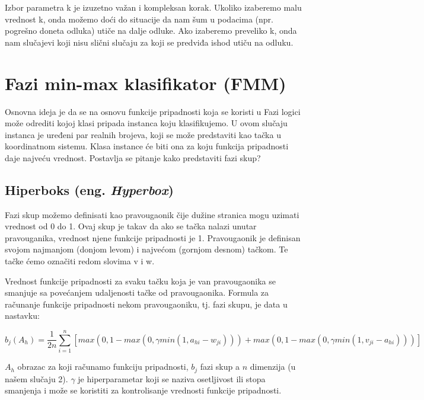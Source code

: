 \documentclass[a4paper]{article}
\begin{document}
Izbor parametra k je izuzetno važan i kompleksan korak. Ukoliko izaberemo malu vrednost k, onda možemo doći do situacije da nam
šum u podacima (npr. pogrešno doneta odluka) utiče na dalje odluke. Ako izaberemo preveliko k, onda nam slučajevi koji nisu slični slučaju 
za koji se predviđa ishod utiču na odluku.\cite{knn}

\section{Fazi min-max klasifikator (FMM)}
\label{faziminmaxcl}

Osnovna ideja je da se na osnovu funkcije pripadnosti koja se koristi u Fazi logici može odrediti kojoj klasi pripada instanca koju 
klasifikujemo. U ovom slučaju instanca je uređeni par realnih brojeva, koji se može predstaviti kao tačka u koordinatnom sistemu. 
Klasa instance će biti ona za koju funkcija pripadnosti daje najveću vrednost. Postavlja se pitanje kako predstaviti fazi skup?\cite{mmf}

\subsection{Hiperboks  (eng. \emph{Hyperbox})}
\label{hiperboks}

Fazi skup možemo definisati kao pravougaonik čije dužine stranica mogu uzimati vrednost od 0 do 1. Ovaj skup je takav da ako se tačka 
nalazi unutar pravouganika, vrednost njene funkcije pripadnosti je 1. Pravougaonik je definisan svojom najmanjom (donjom levom) i 
najvećom (gornjom desnom) tačkom. Te tačke ćemo označiti redom slovima v i w.

Vrednost funkcije pripadnosti za svaku tačku koja je van pravougaonika se smanjuje sa povećanjem udaljenosti tačke od pravougaonika. 
Formula za računanje funkcije pripadnosti nekom pravougaoniku, tj. fazi skupu, je data u nastavku:

\begin{equation}
    b_j(A_h) = \frac{1}{2n}\sum_{i=1}^{n}[max(0, 1 - max(0, \gamma min(1, a_{hi}-w_{ji}))) + max(0, 1 - max(0, \gamma min(1, v_{ji}-a_{hi})))]
\end{equation}

$A_h$ obrazac za koji računamo funkciju pripadnosti, $b_j$ fazi skup a $n$ dimenzija (u našem slučaju 2). $\gamma$ je hiperparametar 
koji se naziva osetljivost ili stopa smanjenja i može se koristiti za kontrolisanje vrednosti funkcije pripadnosti.
\end{document}
